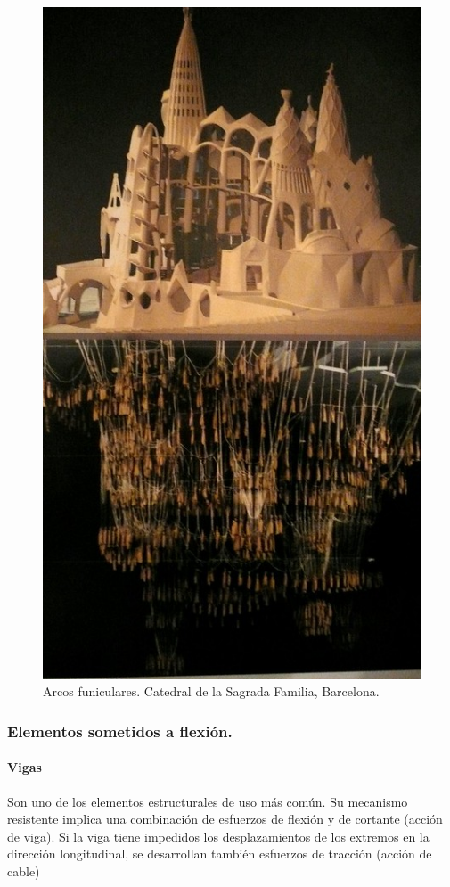 \begin{figure}[h]
    \centering
    \includegraphics[width=0.75\linewidth]{Imagenes/Gaudi.png}
    \caption{Arcos funiculares. Catedral de la Sagrada Familia, Barcelona.}
\end{figure}

\subsubsection{Elementos sometidos a flexión.}
\paragraph{Vigas}
Son uno de los elementos estructurales de uso más común. Su mecanismo resistente implica una combinación de esfuerzos de flexión y de cortante (acción de viga). Si la viga tiene impedidos los desplazamientos de los extremos en la dirección longitudinal, se desarrollan también esfuerzos de tracción (acción de cable)

